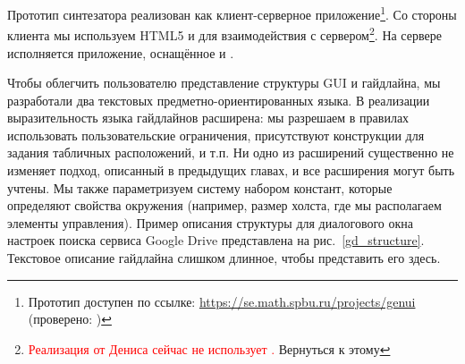Прототип синтезатора реализован как клиент-серверное приложение\footnote{Прототип доступен по ссылке:
\url{https://se.math.spbu.ru/projects/genui} (проверено: )}.
Со стороны клиента мы используем \textsc{HTML5} и \JavaScript{} для взаимодействия с сервером\footnote{\textcolor{red}{Реализация от Дениса сейчас не использует \JSOO.} Вернуться к этому }.
На сервере исполняется \OCaml приложение, оснащённое \OCanren{} и \Zthree{}.


Чтобы облегчить пользователю представление структуры GUI и гайдлайна, мы разработали два текстовых предметно-ориентированных языка.
В реализации выразительность языка гайдлайнов   расширена: мы разрешаем в правилах использовать пользовательские ограничения, присутствуют конструкции для задания табличных расположений, и т.п. Ни одно из расширений существенно не изменяет подход, описанный в предыдущих главах, и все расширения могут быть учтены.
Мы также параметризуем систему набором констант, которые определяют свойства окружения (например, размер холста, где мы располагаем элементы управления).
Пример описания структуры для диалогового окна настроек поиска сервиса Google Drive представлена на рис.~\ref{gd_structure}.
Текстовое описание гайдлайна слишком длинное, чтобы представить его здесь.



